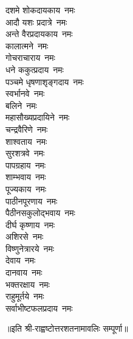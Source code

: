 \begin{flushleft}
\begin{multicols}{2}
दशमे शोकदायकाय~नमः\\
आदौ यशः प्रदात्रे~नमः\\
अन्ते वैरप्रदायकाय~नमः\\
कालात्मने~नमः\\
गोचराचाराय~नमः\\
धने ककुत्प्रदाय~नमः\\
पञ्चमे धृषणाशृङ्गदाय~नमः\\
स्वर्भानवे~नमः\hfill{}\\
बलिने~नमः\\
महासौख्यप्रदायिने~नमः\\
चन्द्रवैरिणे~नमः\\
शाश्वताय~नमः\\
सुरशत्रवे~नमः\\
पापग्रहाय~नमः\\
शाम्भवाय~नमः\\
पूज्यकाय~नमः\\
पाठीनपूरणाय~नमः\\
पैठीनसकुलोद्भवाय~नमः\hfill{}\\
दीर्घ कृष्णाय~नमः\\
अशिरसे~नमः\\
विष्णुनेत्रारये~नमः\\
देवाय~नमः\\
दानवाय~नमः\\
भक्तरक्षाय~नमः\\
राहुमूर्तये~नमः\\
सर्वाभीष्टफलप्रदाय~नमः\\
\end{multicols}
\end{flushleft}
॥इति श्री-राह्वष्टोत्तरशतनामावलिः सम्पूर्णा॥
